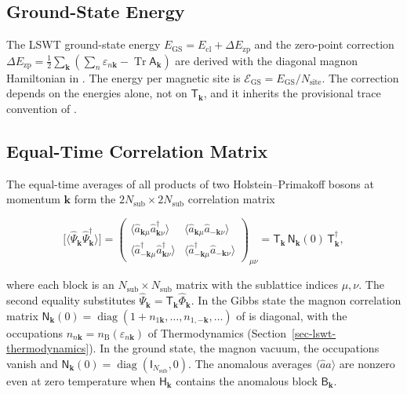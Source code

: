 \subsection{Ground-State Energy}

The LSWT ground-state energy \(E_{\mathrm{GS}}=E_{\mathrm{cl}}+\Delta E_{\mathrm{zp}}\) and the zero-point correction \(\Delta E_{\mathrm{zp}}=\frac12\sum_{\mathbf k}(\sum_n\varepsilon_{n\mathbf k}-\operatorname{Tr}\mathsf A_{\mathbf k})\) are derived with the diagonal magnon Hamiltonian in . The energy per magnetic site is \(\mathcal E_{\mathrm{GS}}=E_{\mathrm{GS}}/N_{\mathrm{site}}\). The correction depends on the energies alone, not on \(\mathsf T_{\mathbf k}\), and it inherits the provisional trace convention of .

\subsection{Equal-Time Correlation Matrix}

The equal-time averages of all products of two Holstein--Primakoff bosons at momentum \(\mathbf k\) form the \(2N_{\mathrm{sub}}\times2N_{\mathrm{sub}}\) correlation matrix

\begin{equation}\label{eq-lswt-boson-correlation-matrix}
\Big[\big\langle\hat\Psi_{\mathbf k}\hat\Psi_{\mathbf k}^\dagger\big\rangle\Big]
=\begin{pmatrix}
\langle\hat a_{\mathbf k\mu}\hat a_{\mathbf k\nu}^\dagger\rangle & \langle\hat a_{\mathbf k\mu}\hat a_{-\mathbf k\nu}\rangle\\
\langle\hat a_{-\mathbf k\mu}^\dagger\hat a_{\mathbf k\nu}^\dagger\rangle & \langle\hat a_{-\mathbf k\mu}^\dagger\hat a_{-\mathbf k\nu}\rangle
\end{pmatrix}_{\mu\nu}
=\mathsf T_{\mathbf k}\,\mathsf N_{\mathbf k}(0)\,\mathsf T_{\mathbf k}^\dagger,
\end{equation}

where each block is an \(N_{\mathrm{sub}}\times N_{\mathrm{sub}}\) matrix with the sublattice indices \(\mu,\nu\). The second equality substitutes \(\hat\Psi_{\mathbf k}=\mathsf T_{\mathbf k}\hat\Phi_{\mathbf k}\). In the Gibbs state the magnon correlation matrix \(\mathsf N_{\mathbf k}(0)=\operatorname{diag}(1+n_{1\mathbf k},\ldots,n_{1,-\mathbf k},\ldots)\) of  is diagonal, with the occupations \(n_{n\mathbf k}=n_{\mathrm B}(\varepsilon_{n\mathbf k})\) of Thermodynamics (Section~\ref{sec-lswt-thermodynamics}). In the ground state, the magnon vacuum, the occupations vanish and \(\mathsf N_{\mathbf k}(0)=\operatorname{diag}(\mathsf I_{N_{\mathrm{sub}}},0)\). The anomalous averages \(\langle\hat a\hat a\rangle\) are nonzero even at zero temperature when \(\mathsf H_{\mathbf k}\) contains the anomalous block \(\mathsf B_{\mathbf k}\).


